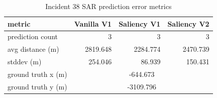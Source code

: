 \begin{table}[ht]
\centering
\caption{Incident 38 SAR prediction error metrics}
\label{tab:sar-incident-38}
\begin{tabular}{lrrr}
\hline
metric & Vanilla V1 & Saliency V1 & Saliency V2 \\
\hline
prediction count & 3 & 3 & 3 \\
avg distance (m) & 2819.648 & 2284.774 & 2470.739 \\
stddev (m) & 254.046 & 86.939 & 150.431 \\
ground truth x (m) & \multicolumn{3}{c}{-644.673} \\
ground truth y (m) & \multicolumn{3}{c}{-3109.796} \\
\hline
\end{tabular}
\end{table}

